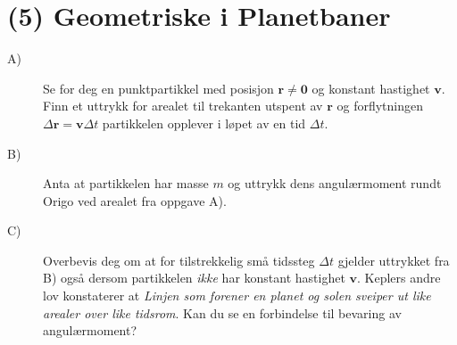 \documentclass[twoside,utf8]{article}
\begin{document}
\section*{(5) Geometriske i Planetbaner}
\begin{description}
  \item[A)] Se for deg en punktpartikkel med posisjon $\mathbf{r}\neq \mathbf{0}$ og konstant hastighet $\mathbf{v}$. Finn et uttrykk for arealet til trekanten utspent av $\mathbf{r}$ og forflytningen $\Delta \mathbf{r} = \mathbf{v} \Delta t$ partikkelen opplever i løpet av en tid $\Delta t$.

  \item[B)] Anta at partikkelen har masse $m$ og uttrykk dens angulærmoment rundt Origo ved arealet fra oppgave A).

  \item[C)] Overbevis deg om at for tilstrekkelig små tidssteg $\Delta t$ gjelder uttrykket fra B) også dersom partikkelen \textit{ikke} har konstant hastighet $\mathbf{v}$.
  Keplers andre lov konstaterer at \textit{Linjen som forener en planet og solen sveiper ut like arealer over like tidsrom}. Kan du se en forbindelse til bevaring av angulærmoment?
\end{description}
\end{document}
